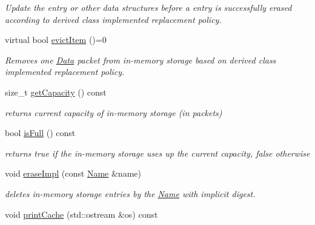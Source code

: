 \begin{DoxyCompactItemize}
\begin{DoxyCompactList}\small\item\em Update the entry or other data structures before a entry is successfully erased according to derived class implemented replacement policy. \end{DoxyCompactList}\item 
virtual bool \hyperlink{classndn_1_1util_1_1InMemoryStorage_a14036928e195645bf47d8c5686277fd8}{evict\+Item} ()=0
\begin{DoxyCompactList}\small\item\em Removes one \hyperlink{classndn_1_1Data}{Data} packet from in-\/memory storage based on derived class implemented replacement policy. \end{DoxyCompactList}\item 
size\+\_\+t \hyperlink{classndn_1_1util_1_1InMemoryStorage_a7cf7faffa6ede0e4ab8e4cf5701acab2}{get\+Capacity} () const
\begin{DoxyCompactList}\small\item\em returns current capacity of in-\/memory storage (in packets) \end{DoxyCompactList}\item 
bool \hyperlink{classndn_1_1util_1_1InMemoryStorage_a2d3f81980ed4b2e6d412bdbd0b74dbaf}{is\+Full} () const\hypertarget{classndn_1_1util_1_1InMemoryStorage_a2d3f81980ed4b2e6d412bdbd0b74dbaf}{}\label{classndn_1_1util_1_1InMemoryStorage_a2d3f81980ed4b2e6d412bdbd0b74dbaf}

\begin{DoxyCompactList}\small\item\em returns true if the in-\/memory storage uses up the current capacity, false otherwise \end{DoxyCompactList}\item 
void \hyperlink{classndn_1_1util_1_1InMemoryStorage_af8b8154e15a36fe75d99890ef992b09a}{erase\+Impl} (const \hyperlink{classndn_1_1Name}{Name} \&name)
\begin{DoxyCompactList}\small\item\em deletes in-\/memory storage entries by the \hyperlink{classndn_1_1Name}{Name} with implicit digest. \end{DoxyCompactList}\item 
void \hyperlink{classndn_1_1util_1_1InMemoryStorage_a4121122daf219c210687f25dd956ab2a}{print\+Cache} (std\+::ostream \&os) const\hypertarget{classndn_1_1util_1_1InMemoryStorage_a4121122daf219c210687f25dd956ab2a}{}\label{classndn_1_1util_1_1InMemoryStorage_a4121122daf219c210687f25dd956ab2a}


\end{DoxyCompactItemize}
